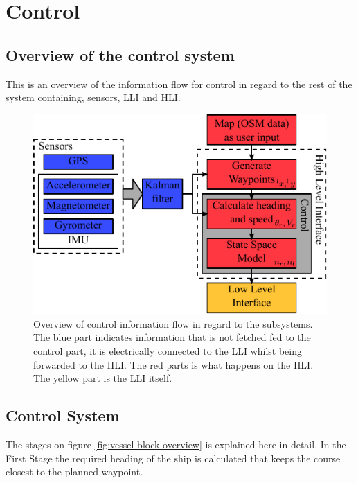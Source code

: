 \chapter{Control}
\label{chap:control}

\section{Overview of the control system}
This is an overview of the information flow for control in regard to the rest of the system containing, sensors, \ac{LLI} and \ac{HLI}.

\begin{figure}[htbp]
	\centering
	\includegraphics[width=\textwidth]{img/vessel-block-overview}
	\caption{Overview of control information flow in regard to the subsystems. The blue part indicates information that is not fetched fed to the control part, it is electrically connected to the \ac{LLI} whilst being forwarded to the \ac{HLI}. The red parts is what happens on the \ac{HLI}. The yellow part is the \ac{LLI} itself.}
	\label{fig:vessel-block-overview}
\end{figure}




\section{Control System}
The stages on figure \vref{fig:vessel-block-overview} is explained here in detail. In the First Stage the required heading of the ship is calculated that keeps the course closest to the planned waypoint.

